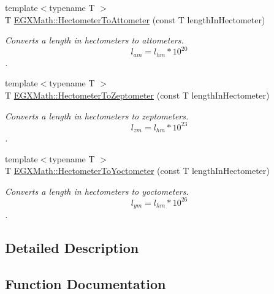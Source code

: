 \begin{DoxyCompactItemize}
{\footnotesize template$<$typename T $>$ }\\T \mbox{\hyperlink{group___e_g_x_math-_conversions-_length_conversions-_hectometer-_s_i_ga86348086f2a5b950cad06205d42bed4e}{E\+G\+X\+Math\+::\+Hectometer\+To\+Attometer}} (const T length\+In\+Hectometer)
\begin{DoxyCompactList}\small\item\em Converts a length in hectometers to attometers. \[ l_{am}=l_{hm} * 10^{20} \]. \end{DoxyCompactList}\item 
{\footnotesize template$<$typename T $>$ }\\T \mbox{\hyperlink{group___e_g_x_math-_conversions-_length_conversions-_hectometer-_s_i_ga8ad2a40e4868b0a8de07e0e6f416f025}{E\+G\+X\+Math\+::\+Hectometer\+To\+Zeptometer}} (const T length\+In\+Hectometer)
\begin{DoxyCompactList}\small\item\em Converts a length in hectometers to zeptometers. \[ l_{zm}=l_{hm} * 10^{23} \]. \end{DoxyCompactList}\item 
{\footnotesize template$<$typename T $>$ }\\T \mbox{\hyperlink{group___e_g_x_math-_conversions-_length_conversions-_hectometer-_s_i_ga64c07f341a87b8ebd6a7c10129e3a924}{E\+G\+X\+Math\+::\+Hectometer\+To\+Yoctometer}} (const T length\+In\+Hectometer)
\begin{DoxyCompactList}\small\item\em Converts a length in hectometers to yoctometers. \[ l_{ym}=l_{hm} * 10^{26} \]. \end{DoxyCompactList}\end{DoxyCompactItemize}


\subsection{Detailed Description}


\subsection{Function Documentation}
\mbox{\label{group___e_g_x_math-_conversions-_length_conversions-_hectometer-_s_i_ga86348086f2a5b950cad06205d42bed4e}} 
